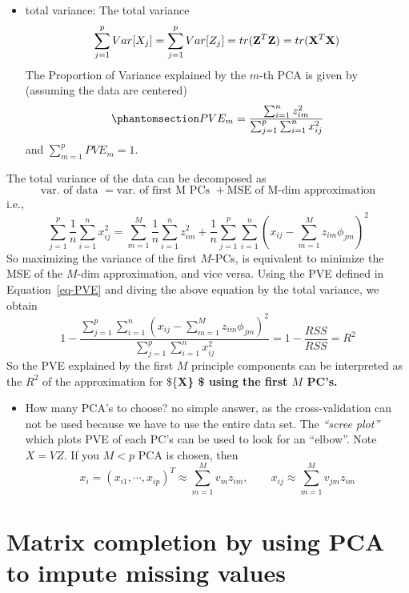 \documentclass[
  letterpaper,
  DIV=11,
  numbers=noendperiod]{scrreprt}
\providecommand{\tightlist}{%
  \setlength{\itemsep}{0pt}\setlength{\parskip}{0pt}}\usepackage{longtable,booktabs,array}
\begin{document}
\begin{itemize}
\tightlist
\item
  total variance: The total variance \[
  \sum_{j=1}^p Var[X_j] = \sum_{j=1}^pVar[Z_j]=tr({\bf Z}^T{\bf Z})=tr({\bf X}^T{\bf X})
  \] The Proportion of Variance explained by the \(m\)-th PCA is given
  by (assuming the data are centered)
  \begin{equation}\phantomsection\label{eq-PVE}{
  PVE_m=\frac{\sum_{i=1}^n z_{im}^2}{\sum_{j=1}^p\sum_{i=1}^n x_{ij}^2}
  }\end{equation} and \(\sum_{m=1}^p PVE_m = 1\).
\end{itemize}

The total variance of the data can be decomposed as \[
\text{var. of data }= \text{var. of first M PCs } + \text{MSE of M-dim approximation}
\] i.e., \[
\sum_{j=1}^p\frac{1}{n} \sum_{i=1}^n x_{ij}^2 = \sum_{m=1}^M\frac{1}{n} \sum_{i=1}^n z_{im}^2 + \frac{1}{n} \sum_{j=1}^p \sum_{i=1}^n \left( x_{ij}- \sum_{m=1}^M z_{im}\phi_{jm}\right)^2
\] So maximizing the variance of the first \(M\)-PCs, is equivalent to
minimize the MSE of the \(M\)-dim approximation, and vice versa. Using
the PVE defined in Equation~\ref{eq-PVE} and diving the above equation
by the total variance, we obtain \[
1-\frac{\sum_{j=1}^p \sum_{i=1}^n \left( x_{ij}- \sum_{m=1}^M z_{im}\phi_{jm}\right)^2}{\sum_{j=1}^p \sum_{i=1}^n x_{ij}^2}=1-\frac{RSS}{RSS}=R^2
\] So the PVE explained by the first \(M\) principle components can be
interpreted as the \(R^2\) of the approximation for \$\{\bf X\} \$ using
the first \(M\) PC's.

\begin{itemize}
\tightlist
\item
  How many PCA's to choose? no simple answer, as the cross-validation
  can not be used because we have to use the entire data set. The
  \emph{``scree plot''} which plots PVE of each PC's can be used to look
  for an ``elbow''. Note \(X=VZ\). If you \(M<p\) PCA is chosen, then
  \[x_i=(x_{i1}, \cdots, x_{ip})^T \approx \sum_{m=1}^M v_m z_{im},\qquad x_{ij}\approx \sum_{m=1}^M v_{jm} z_{im}
  \]
\end{itemize}

\section{Matrix completion by using PCA to impute missing
values}\label{matrix-completion-by-using-pca-to-impute-missing-values}
\end{document}
